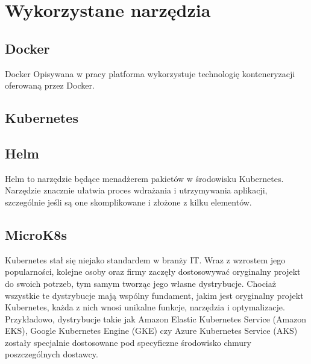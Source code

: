 \newpage

\section{Wykorzystane narzędzia}\label{sec:wykorzystane-narzedzia}


\subsection{Docker}\label{subsec:docker}

Docker 
Opisywana w pracy platforma wykorzystuje technologię konteneryzacji oferowaną przez Docker.

\subsection{Kubernetes}\label{subsec:kubernetes}


\subsection{Helm}\label{subsec:helm}

Helm to narzędzie będące menadżerem pakietów w środowisku Kubernetes.
Narzędzie znacznie ułatwia proces wdrażania i utrzymywania aplikacji, szczególnie jeśli są one skomplikowane i złożone z kilku elementów.

\subsection{MicroK8s}\label{subsec:microk8s}

Kubernetes stał się niejako standardem w branży IT\@.
Wraz z wzrostem jego popularności, kolejne osoby oraz firmy zaczęły dostosowywać oryginalny projekt do swoich potrzeb, tym samym tworząc jego własne dystrybucje.
Chociaż wszystkie te dystrybucje mają wspólny fundament, jakim jest oryginalny projekt Kubernetes, każda z nich wnosi unikalne funkcje, narzędzia i optymalizacje.
Przykładowo, dystrybucje takie jak Amazon Elastic Kubernetes Service (Amazon EKS), Google Kubernetes Engine (GKE) czy Azure Kubernetes Service (AKS) zostały specjalnie dostosowane pod specyficzne środowisko chmury poszczególnych dostawcy.

